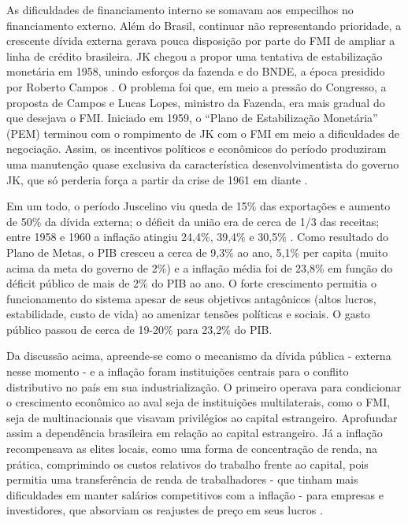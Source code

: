 As dificuldades de financiamento interno se somavam aos empecilhos no
financiamento externo. Além do Brasil, continuar não representando
prioridade, a crescente dívida externa gerava pouca disposição por parte
do FMI de ampliar a linha de crédito brasileira. JK chegou a propor uma
tentativa de estabilização monetária em 1958, unindo esforços da fazenda
e do BNDE, a época presidido por Roberto Campos \citep{villela_dos_2025}. O problema foi
que, em meio a pressão do Congresso, a proposta de Campos e Lucas Lopes,
ministro da Fazenda, era mais gradual do que desejava o FMI. Iniciado em
1959, o ``Plano de Estabilização Monetária'' (PEM) terminou com o
rompimento de JK com o FMI em meio a dificuldades de negociação. Assim,
os incentivos políticos e econômicos do período produziram uma
manutenção quase exclusiva da característica desenvolvimentista do
governo JK, que só perderia força a partir da crise de 1961 em diante
\citep{abreu_ordem_2014}.

Em um todo, o período Juscelino viu queda de 15\% das exportações e
aumento de 50\% da dívida externa; o déficit da união era de cerca de
1/3 das receitas; entre 1958 e 1960 a inflação atingiu 24,4\%, 39,4\% e
30,5\% \citep{villela_dos_2025}. Como resultado do Plano de Metas, o PIB
cresceu a cerca de 9,3\% ao ano, 5,1\% per capita (muito acima da meta
do governo de 2\%) e a inflação média foi de 23,8\% em função do déficit
público de mais de 2\% do PIB ao ano. O forte crescimento permitia o
funcionamento do sistema apesar de seus objetivos antagônicos (altos
lucros, estabilidade, custo de vida) ao amenizar tensões políticas e
sociais. O gasto público passou de cerca de 19-20\% para 23,2\% do PIB.

Da discussão acima, apreende-se como o mecanismo da dívida pública -
externa nesse momento - e a inflação foram instituições centrais para o
conflito distributivo no país em sua industrialização. O primeiro
operava para condicionar o crescimento econômico ao aval seja de
instituições multilaterais, como o FMI, seja de multinacionais que
visavam privilégios ao capital estrangeiro. Aprofundar assim a
dependência brasileira em relação ao capital estrangeiro. Já a inflação
recompensava as elites locais, como uma forma de
concentração de renda, na prática, comprimindo os custos relativos do
trabalho frente ao capital, pois permitia uma transferência de renda de
trabalhadores - que tinham mais dificuldades em manter salários
competitivos com a inflação - para empresas e investidores, que
absorviam os reajustes de preço em seus lucros .

